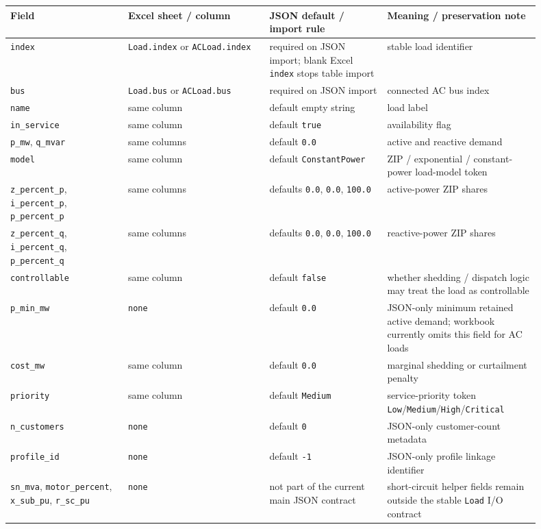 \begin{longtable}{L{0.20\linewidth}L{0.24\linewidth}L{0.20\linewidth}L{0.26\linewidth}}
\toprule
Field & Excel sheet / column & JSON default / import rule & Meaning / preservation note \\
\midrule
\endhead
\texttt{index} & \texttt{Load.index} or \texttt{ACLoad.index} & required on JSON import; blank Excel \texttt{index} stops table import & stable load identifier \\
\texttt{bus} & \texttt{Load.bus} or \texttt{ACLoad.bus} & required on JSON import & connected AC bus index \\
\texttt{name} & same column & default empty string & load label \\
\texttt{in\_service} & same column & default \texttt{true} & availability flag \\
\texttt{p\_mw}, \texttt{q\_mvar} & same columns & default \texttt{0.0} & active and reactive demand \\
\texttt{model} & same column & default \texttt{ConstantPower} & ZIP / exponential / constant-power load-model token \\
\texttt{z\_percent\_p}, \texttt{i\_percent\_p}, \texttt{p\_percent\_p} & same columns & defaults \texttt{0.0}, \texttt{0.0}, \texttt{100.0} & active-power ZIP shares \\
\texttt{z\_percent\_q}, \texttt{i\_percent\_q}, \texttt{p\_percent\_q} & same columns & defaults \texttt{0.0}, \texttt{0.0}, \texttt{100.0} & reactive-power ZIP shares \\
\texttt{controllable} & same column & default \texttt{false} & whether shedding / dispatch logic may treat the load as controllable \\
\texttt{p\_min\_mw} & \texttt{none} & default \texttt{0.0} & JSON-only minimum retained active demand; workbook currently omits this field for AC loads \\
\texttt{cost\_mw} & same column & default \texttt{0.0} & marginal shedding or curtailment penalty \\
\texttt{priority} & same column & default \texttt{Medium} & service-priority token \texttt{Low}/\texttt{Medium}/\texttt{High}/\texttt{Critical} \\
\texttt{n\_customers} & \texttt{none} & default \texttt{0} & JSON-only customer-count metadata \\
\texttt{profile\_id} & \texttt{none} & default \texttt{-1} & JSON-only profile linkage identifier \\
\texttt{sn\_mva}, \texttt{motor\_percent}, \texttt{x\_sub\_pu}, \texttt{r\_sc\_pu} & \texttt{none} & not part of the current main JSON contract & short-circuit helper fields remain outside the stable \texttt{Load} I/O contract \\
\bottomrule
\end{longtable}

